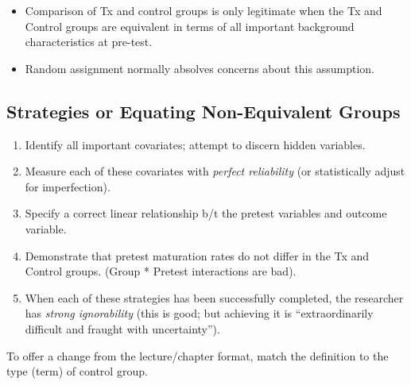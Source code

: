 \documentclass[
  english,
]{book}
\providecommand{\tightlist}{%
  \setlength{\itemsep}{0pt}\setlength{\parskip}{0pt}}
\begin{document}
\begin{itemize}
\tightlist
\item
  Comparison of Tx and control groups is only legitimate when the Tx and Control groups are equivalent in terms of all important background characteristics at pre-test.
\item
  Random assignment normally absolves concerns about this assumption.
\end{itemize}

\hypertarget{strategies-or-equating-non-equivalent-groups}{%
\subsection{Strategies or Equating Non-Equivalent Groups}\label{strategies-or-equating-non-equivalent-groups}}

\begin{enumerate}
\def\labelenumi{\arabic{enumi}.}
\tightlist
\item
  Identify all important covariates; attempt to discern hidden variables.
\item
  Measure each of these covariates with \emph{perfect reliability} (or statistically adjust for imperfection).
\item
  Specify a correct linear relationship b/t the pretest variables and outcome variable.
\item
  Demonstrate that pretest maturation rates do not differ in the Tx and Control groups. (Group * Pretest interactions are bad).
\item
  When each of these strategies has been successfully completed, the researcher has \emph{strong ignorability} (this is good; but achieving it is ``extraordinarily difficult and fraught with uncertainty'').
\end{enumerate}

To offer a change from the lecture/chapter format, match the definition to the type (term) of control group.
\end{document}
